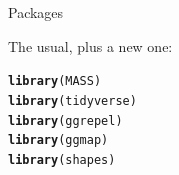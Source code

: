 \documentclass[unknownkeysallowed]{beamer}\usepackage[]{graphicx}\usepackage[]{color}
\makeatletter
\newcommand{\hlstd}[1]{\textcolor[rgb]{0.345,0.345,0.345}{#1}}%
\newcommand{\hlkwd}[1]{\textcolor[rgb]{0.737,0.353,0.396}{\textbf{#1}}}%
\newenvironment{kframe}{%
 \def\at@end@of@kframe{}%
 \ifinner\ifhmode%
  \def\at@end@of@kframe{\end{minipage}}%
  \begin{minipage}{\columnwidth}%
 \fi\fi%
 \def\FrameCommand##1{\hskip\@totalleftmargin \hskip-\fboxsep
 \colorbox{shadecolor}{##1}\hskip-\fboxsep
     \hskip-\linewidth \hskip-\@totalleftmargin \hskip\columnwidth}%
 \MakeFramed {\advance\hsize-\width
   \@totalleftmargin\z@ \linewidth\hsize
   \@setminipage}}%
 {\par\unskip\endMakeFramed%
 \at@end@of@kframe}
\newenvironment{knitrout}{}{} %
\makeatother
\begin{document}
\begin{frame}[fragile]{Packages}
  
  The usual, plus a new one:
  
\begin{knitrout}\footnotesize
{}\color{fgcolor}\begin{kframe}
\begin{alltt}
\hlkwd{library}\hlstd{(MASS)}
\hlkwd{library}\hlstd{(tidyverse)}
\hlkwd{library}\hlstd{(ggrepel)}
\hlkwd{library}\hlstd{(ggmap)}
\hlkwd{library}\hlstd{(shapes)}
\end{alltt}
\end{kframe}
\end{knitrout}
  
\end{frame}
\end{document}
